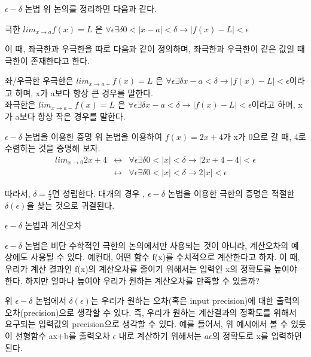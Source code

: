 \documentclass{beamer}
\begin{document}
\begin{frame}{$\epsilon-\delta$ 논법}
위 논의를 정리하면 다음과 같다. 

\begin{block}{극한} 
$lim_{x\rightarrow a} f(x) = L$ 은 $\forall \epsilon \exists \delta 0<|x-a|<\delta \rightarrow |f(x)-L| < \epsilon$
\end{block}

이 때, 좌극한과 우극한을 따로 다음과 같이 정의하며, 좌극한과 우극한이 같은 값일 때 극한이 존재한다고 한다. 

\begin{block}{좌/우극한} 
우극한은 $lim_{x\rightarrow a+} f(x) = L$ 은 $\forall \epsilon \exists \delta x-a<\delta \rightarrow |f(x)-L| < \epsilon$이라고 하며, x가 a보다 항상 큰 경우를 말한다. \\
좌극한은 $lim_{x\rightarrow a-} f(x) = L$ 은 $\forall \epsilon \exists \delta x-a<\delta \rightarrow |f(x)-L| < \epsilon$이라고 하며, x가 a보다 항상 작은 경우를 말한다. 
\end{block}
\end{frame} 

\begin{frame}{$\epsilon-\delta$ 논법을 이용한 증명}
위 논법을 이용하여 $f(x) = 2x+4$가 x가 0으로 갈 때, 4로 수렴하는 것을 증명해 보자. 
\begin{eqnarray} 
lim_{x \rightarrow 0} 2x+4 &\leftrightarrow& \forall \epsilon \exists \delta 0<|x|<\delta \rightarrow |2x+4-4|<\epsilon \\ 
& \leftrightarrow & \forall \epsilon \exists \delta 0<|x|<\delta \rightarrow 2|x|<\epsilon
\end{eqnarray}

따라서, $\delta = \frac{\epsilon}{2}$면 성립한다. 대개의 경우 , $\epsilon-\delta$ 논법을 이용한 극한의 증명은 적절한 $\delta(\epsilon)$을 찾는 것으로 귀결된다. 
\end{frame} 

\begin{frame}{$\epsilon-\delta$ 논법과 계산오차} 

$\epsilon-\delta$ 논법은 비단 수학적인 극한의 논의에서만 사용되는 것이 아니라, 계산오차의 예상에도 사용될 수 있다. 예컨대, 어떤 함수 f(x)를 수치적으로 계산한다고 하자. 이 때, 우리가 계산 결과인 f(x)의 계산오차를 줄이기 위해서는 입력인 x의 정확도를 높여야 한다. 하지만 얼마나 높여야 우리가 원하는 계산오차를 만족할 수 있을까? 

위 $\epsilon-\delta$ 논법에서 $\delta(\epsilon)$는 우리가 원하는 오차(혹은 input precision)에 대한 출력의 오차(precision)으로 생각할 수 있다. 즉, 우리가 원하는 계산결과의 정확도를 위해서 요구되는 입력값의 precision으로 생각할 수 있다. 예를 들어서, 위 예시에서 볼 수 있듯이 선형함수 ax+b를 출력오차 $\epsilon$ 내로 계산하기 위해서는 $a \epsilon$의 정확도로 x를 입력하면 된다. 

\end{frame}
\end{document}
